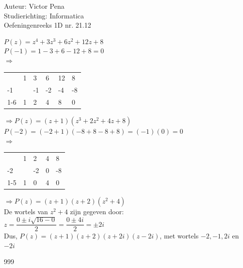 \documentclass[a4paper]{article}
\begin{document}
	
	\noindent \large Auteur: Victor Pena \\
	\noindent \large Studierichting: Informatica\\
	\noindent \large Oefeningenreeks 1D nr. 21.12\\

	\medskip
	
	\normalsize 
	
	$P(z)=z^4 +3z^3 + 6z^2 + 12z + 8$ \\
	
	$P(-1)= 1 - 3 + 6 - 12 + 8 = 0$\\
	
	$\Rightarrow$ \begin{tabular}{l|llll|l}
		  & 1   & 3   & 6   &12  & 8 \\
		-1&     & -1  & -2  & -4 & -8\\  \cline{1-6}
		  & 1   & 2   & 4   &8   &0
	\end{tabular} $\Rightarrow P(z) = (z+1)(z^3 + 2z^2 + 4z + 8)$\\
	
	$P(-2) = (-2+1)(-8  + 8 - 8 + 8) = (-1)(0) = 0$ \\
	
	$\Rightarrow$ \begin{tabular}{l|lll|l}
		  & 1   & 2   & 4   &8   \\
		-2&     & -2& 0  & -8 \\  \cline{1-5}
		  & 1   & 0   & 4   &0  
	\end{tabular} $\Rightarrow P(z) = (z+1)(z+2)(z^2 + 4)$\\
	
	De wortels van $z^2 + 4$ zijn gegeven door: \\
	
	$z = \dfrac{0 \pm i\sqrt{16-0}}{2} = \dfrac{0 \pm 4i}{2} = \pm 2i$\\
	
	
	Dus, $P(z) = (z+1)(z+2)(z+2i)(z-2i)$, met wortels $-2,-1,2i$ en $-2i$ \\
	
	
	
	
	
	
	
	
	
	\begin{thebibliography}{999}
	\end{thebibliography}
\end{document}
